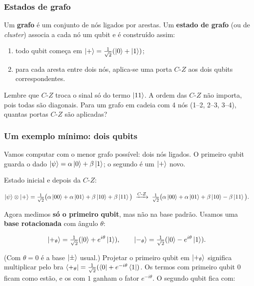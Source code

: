 \subsubsection{Estados de grafo}\label{estados-de-grafo}

Um \textbf{grafo} é um conjunto de nós ligados por arestas. Um \textbf{estado de grafo} (ou de \emph{cluster}) associa a cada nó um qubit e é construído assim:

\begin{enumerate}
\def\labelenumi{\arabic{enumi}.}
\tightlist
\item
  todo qubit começa em \(\left|{+}\right> = \tfrac{1}{\sqrt2}(\left|{0}\right>+\left|{1}\right>)\);
\item
  para cada aresta entre dois nós, aplica-se uma porta \(C\text{-}Z\) aos dois qubits correspondentes.
\end{enumerate}

Lembre que \(C\text{-}Z\) troca o sinal só do termo \(\left|{11}\right>\). A ordem das \(C\text{-}Z\) não importa, pois todas são diagonais. Para um grafo em cadeia com 4 nós (1--2, 2--3, 3--4), quantas portas \(C\text{-}Z\) são aplicadas?

\subsubsection{Um exemplo mínimo: dois qubits}\label{um-exemplo-muxednimo-dois-qubits}

Vamos computar com o menor grafo possível: dois nós ligados. O primeiro qubit guarda o dado \(\left|{\psi}\right> = \alpha\left|{0}\right>+\beta\left|{1}\right>\); o segundo é um \(\left|{+}\right>\) novo.

Estado inicial e depois da \(C\text{-}Z\):

\[
\left|{\psi}\right>\otimes\left|{+}\right> = \tfrac{1}{\sqrt2}\big(\alpha\left|{00}\right>+\alpha\left|{01}\right>+\beta\left|{10}\right>+\beta\left|{11}\right>\big)
\;\xrightarrow{C\text{-}Z}\;
\tfrac{1}{\sqrt2}\big(\alpha\left|{00}\right>+\alpha\left|{01}\right>+\beta\left|{10}\right>-\beta\left|{11}\right>\big).
\]

Agora medimos \textbf{só o primeiro qubit}, mas não na base padrão. Usamos uma \textbf{base rotacionada} com ângulo \(\theta\):

\[
\left|{+_\theta}\right> = \tfrac{1}{\sqrt2}(\left|{0}\right>+e^{i\theta}\left|{1}\right>), \qquad
\left|{-_\theta}\right> = \tfrac{1}{\sqrt2}(\left|{0}\right>-e^{i\theta}\left|{1}\right>).
\]

(Com \(\theta=0\) é a base \(\left|{\pm}\right>\) usual.) Projetar o primeiro qubit em \(\left|{+_\theta}\right>\) significa multiplicar pelo bra \(\left<{+_\theta}\right| = \tfrac{1}{\sqrt2}(\left<{0}\right|+e^{-i\theta}\left<{1}\right|)\). Os termos com primeiro qubit \(0\) ficam como estão, e os com \(1\) ganham o fator \(e^{-i\theta}\). O segundo qubit fica com:

